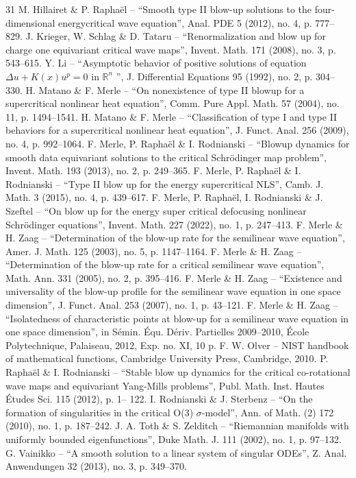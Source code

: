 \documentclass[10pt]{article}
\theoremstyle{plain}
\theoremstyle{definition}
\begin{document}
\begin{thebibliography}{31}
 M. Hillairet \& P. Raphaël – “Smooth type II blow-up solutions to the four-dimensional energycritical wave equation”, Anal. PDE 5 (2012), no. 4, p. 777–829.
 J. Krieger, W. Schlag \& D. Tataru – “Renormalization and blow up for charge one equivariant critical wave maps”, Invent. Math. 171 (2008), no. 3, p. 543–615.
 Y. Li – “Asymptotic behavior of positive solutions of equation $\Delta u+K(x)u^p=0$ in $\mathbb R^n$ ”, J. Differential Equations 95 (1992), no. 2, p. 304–330.
 H. Matano \& F. Merle – “On nonexistence of type II blowup for a supercritical nonlinear heat equation”, Comm. Pure Appl. Math. 57 (2004), no. 11, p. 1494–1541.
 H. Matano \& F. Merle – “Classification of type I and type II behaviors for a supercritical nonlinear heat equation”, J. Funct. Anal. 256 (2009), no. 4, p. 992–1064.
 F. Merle, P. Raphaël \& I. Rodnianski – “Blowup dynamics for smooth data equivariant solutions to the critical Schrödinger map problem”, Invent. Math. 193 (2013), no. 2, p. 249–365.
 F. Merle, P. Raphaël \& I. Rodnianski – “Type II blow up for the energy supercritical NLS”, Camb. J. Math. 3 (2015), no. 4, p. 439–617.
 F. Merle, P. Raphaël, I. Rodnianski \& J. Szeftel – “On blow up for the energy super critical defocusing nonlinear Schrödinger equations”, Invent. Math. 227 (2022), no. 1, p. 247–413.
 F. Merle \& H. Zaag – “Determination of the blow-up rate for the semilinear wave equation”, Amer. J. Math. 125 (2003), no. 5, p. 1147–1164.
 F. Merle \& H. Zaag – “Determination of the blow-up rate for a critical semilinear wave equation”, Math. Ann. 331 (2005), no. 2, p. 395–416.
 F. Merle \& H. Zaag – “Existence and universality of the blow-up profile for the semilinear wave equation in one space dimension”, J. Funct. Anal. 253 (2007), no. 1, p. 43–121.
 F. Merle \& H. Zaag – “Isolatedness of characteristic points at blow-up for a semilinear wave equation in one space dimension”, in Sémin. Équ. Dériv. Partielles 2009–2010, École Polytechnique, Palaiseau, 2012, Exp. no. XI, 10 p.
 F. W. Olver – NIST handbook of mathematical functions, Cambridge University Press, Cambridge, 2010.
 P. Raphaël \& I. Rodnianski – “Stable blow up dynamics for the critical co-rotational wave maps and equivariant Yang-Mills problems”, Publ. Math. Inst. Hautes Études Sci. 115 (2012), p. 1– 122.
 I. Rodnianski \& J. Sterbenz – “On the formation of singularities in the critical O(3) $\sigma$-model”, Ann. of Math. (2) 172 (2010), no. 1, p. 187–242.
 J. A. Toth \& S. Zelditch – “Riemannian manifolds with uniformly bounded eigenfunctions”, Duke Math. J. 111 (2002), no. 1, p. 97–132.
 G. Vainikko – “A smooth solution to a linear system of singular ODEs”, Z. Anal. Anwendungen 32 (2013), no. 3, p. 349–370.
\end{thebibliography}
\end{document}
